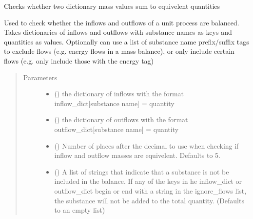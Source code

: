 \documentclass[a4paper,10pt,english]{sphinxmanual}
\begin{document}
\begin{fulllineitems}
\label{\detokenize{calculators:calculators.check_balance}}
Checks whether two dictionary mass values sum to equivelent quantities

Used to check whether the inflows and outflows of a unit process are
balanced. Takes dictionaries of inflows and outflows with substance names
as keys and quantities as values. Optionally can use a list of substance name
prefix/suffix tags to exclude flows (e.g. energy flows in a mass balance), or
only include certain flows (e.g. only include those with the energy tag)
\begin{quote}\begin{description}
\item[{Parameters}] \leavevmode\begin{itemize}
\item {} 
 () \textendash{} the dictionary of inflows with
the format inflow\_dict{[}substance name{]} = quantity

\item {} 
 () \textendash{} the dictionary of outflows with
the format outflow\_dict{[}substance name{]} = quantity

\item {} 
 () \textendash{} Number of places after the decimal to use when checking
if inflow and outflow masses are equivelent.
Defaults to 5.

\item {} 
 (\sphinxstyleliteralemphasis{\sphinxupquote{{[}}}\sphinxstyleliteralemphasis{\sphinxupquote{{]}}}) \textendash{} A list of strings that indicate that a
substance is not be included in the balance. If any of the keys in
he inflow\_dict or outflow\_dict begin or end with a string in the
ignore\_flows list, the substance will not be added to the total
quantity.
(Defaults to an empty list)


\end{itemize}
\end{description}
\end{quote}
\end{fulllineitems}
\end{document}
